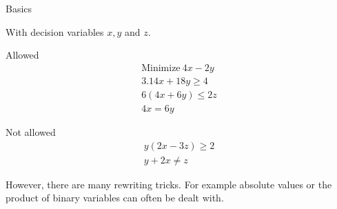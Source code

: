 \documentclass[10pt]{beamer}
\begin{document}
\begin{frame}[fragile]{Basics}

With decision variables $x, y$ and $z$.

\begin{block}{Allowed}
\[\begin{array}{l}
\mbox{Minimize}~4 x - 2 y \\
3.14 x + 18 y \geq 4 \\
6 ( 4 x + 6 y ) \leq 2 z \\
4 x = 6 y
\end{array}\]
\end{block}

\begin{block}{Not allowed}
\[\begin{array}{l}
y ( 2 x - 3 z) \geq 2 \\
y + 2 x \neq z
\end{array}\]
\end{block}

However, there are many rewriting tricks. For example absolute values or the product of binary variables can often be dealt with.

\end{frame}
\end{document}
